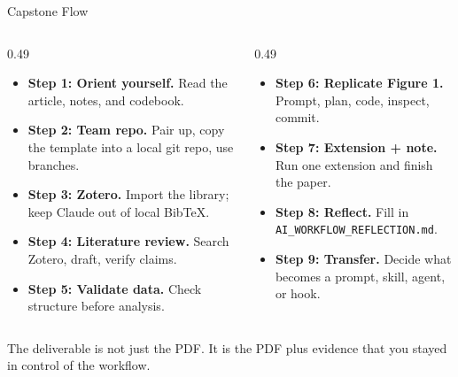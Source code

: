 \documentclass[aspectratio=169, 11pt]{beamer}
\begin{document}
\begin{frame}{Capstone Flow}
  \begin{columns}[T,onlytextwidth]
    \begin{column}{0.49\textwidth}
      \begin{itemize}\scriptsize
        \item \textbf{Step 1: Orient yourself.} Read the article, notes, and codebook.
        \item \textbf{Step 2: Team repo.} Pair up, copy the template into a local git repo, use branches.
        \item \textbf{Step 3: Zotero.} Import the library; keep Claude out of local BibTeX.
        \item \textbf{Step 4: Literature review.} Search Zotero, draft, verify claims.
        \item \textbf{Step 5: Validate data.} Check structure before analysis.
      \end{itemize}
    \end{column}

    \begin{column}{0.49\textwidth}
      \begin{itemize}\scriptsize
        \item \textbf{Step 6: Replicate Figure 1.} Prompt, plan, code, inspect, commit.
        \item \textbf{Step 7: Extension + note.} Run one extension and finish the paper.
        \item \textbf{Step 8: Reflect.} Fill in \texttt{AI\_WORKFLOW\_REFLECTION.md}.
        \item \textbf{Step 9: Transfer.} Decide what becomes a prompt, skill, agent, or hook.
      \end{itemize}
    \end{column}
  \end{columns}

  \vspace{0.4em}
  \alert{\small The deliverable is not just the PDF. It is the PDF plus evidence that you stayed in control of the workflow.}
\end{frame}
\end{document}
